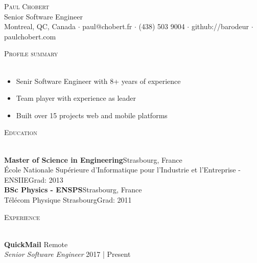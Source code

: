 \documentclass[a4paper]{article}
\newcommand{\lineunder} {
    \vspace*{-8pt} \\
    \hspace*{-18pt} \hrulefill \\
}
\newcommand{\header} [1] {
    {\hspace*{-18pt}\vspace*{6pt} \textsc{#1}}
    \vspace*{-6pt} \lineunder
}
\begin{document}
\vspace*{-40pt}

\vspace*{-10pt}
\begin{center}
    {\Huge \scshape {Paul Chobert}}\\
    Senior Software Engineer\\
    Montreal, QC, Canada $\cdot$ paul@chobert.fr $\cdot$ (438) 503 9004 $\cdot$ github://barodeur $\cdot$ paulchobert.com\\
\end{center}

\vspace*{2mm}

\header{Profile summary}
\vspace{1mm}

\vspace{-1mm}
\begin{itemize} \itemsep 1pt
    \item Senir Software Engineer with 8+ years of experience
    \item Team player with experience as leader
    \item Built over 15 projects web and mobile platforms
\end{itemize}
\vspace{-1mm}

\vspace{2mm}

\header{Education}
\vspace{1mm}

\textbf{Master of Science in Engineering}\hfill Strasbourg, France\\
École Nationale Supérieure d'Informatique pour l'Industrie et l'Entreprise - ENSIIE\hfill Grad: 2013\\
\vspace{2mm}
\textbf{BSc Physics - ENSPS}\hfill Strasbourg, France\\
Télécom Physique Strasbourg\hfill Grad: 2011\\
\vspace{2mm}

\header{Experience}
\vspace{1mm}

\textbf{QuickMail} \hfill Remote\\
\textit{Senior Software Engineer} \hfill 2017 | Present\\
\vspace{2mm}
\end{document}
